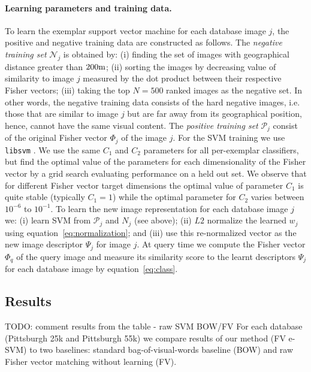 \documentclass[10pt,twocolumn,letterpaper]{article}
\begin{document}
      \paragraph{Learning parameters and training data.}
         To learn the exemplar support vector machine for each database image $j$, the positive and negative training data are constructed as follows. The \emph{negative training set} $\mathcal N_j$ is obtained by: (i) finding the set of images with geographical distance greater than $200{\rm m}$; (ii)  sorting the images by decreasing value of similarity to image $j$ measured by the dot product between their respective Fisher vectors; (iii) taking the top $N=500$ ranked images as the negative set. In other words, the negative training data consists of the hard negative images, i.e. those that are similar to image $j$ but are far away from its geographical position, hence, cannot have the same visual content. The \emph{positive training set} $\mathcal P_j$
         consist of the original Fisher vector $\Phi_j$ of the image $j$.
         For the SVM training we use {\tt libsvm} \cite{libsvm}.
         We use the same $C_1$ and $C_2$ parameters for all per-exemplar classifiers, but find the optimal value of the parameters for each dimensionality of the Fisher vector by a grid search evaluating performance on a held out set.
         We observe that for different Fisher vector target dimensions the optimal value of parameter $C_1$ is quite stable (typically $C_1=1$) while the optimal parameter for $C_2$ varies between $10^{-6}$ to $10^{-1}$.
         To learn the new image representation for each database image $j$ we: (i) learn SVM from $\mathcal P_j$ and $N_j$ (see above); (ii) $L2$ normalize the learned $w_j$ using equation~\eqref{eq:normalization}; and (iii) use this re-normalized vector as the new image descriptor $\Psi_j$ for image $j$. At query time we compute the Fisher vector $\Phi_q$ of the query image and measure its similarity score to the learnt descriptors $\Psi_j$ for each database image by equation~\eqref{eq:class}.
   

   \subsection{Results}  
      \textcolor{petr}{TODO: comment results from the table - raw SVM BOW/FV}  
      For each database (Pittsburgh 25k and Pittsburgh 55k) we compare results of our method (FV e-SVM) to two baselines: standard bag-of-visual-words baseline (BOW) and raw Fisher vector matching without learning (FV). 
\end{document}
